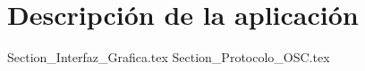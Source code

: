 \chapter{Descripción de la aplicación}

	{Section_Interfaz_Grafica.tex}
	{Section_Protocolo_OSC.tex}
